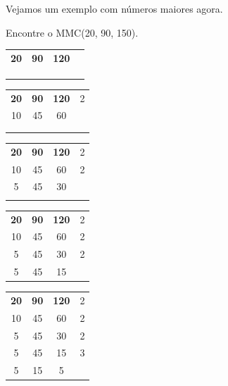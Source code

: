 Vejamos um exemplo com números maiores agora.

\begin{exemplo}
    Encontre o MMC(20, 90, 150).

    \begin{table}[H]
    \centering
    \begin{tabular}{ccc|c}
        \textbf{20} & \textbf{90} & \textbf{120} & \\
         &  &  & \\
         &  &  & \\
         &  &  & \\
    \end{tabular}
    \end{table}

    \begin{table}[H]
    \centering
    \begin{tabular}{ccc|c}
        \textbf{20} & \textbf{90} & \textbf{120} & 2\\
        10 & 45 & 60 & \\
         &  &  & \\
         &  &  & \\
    \end{tabular}
    \end{table}

    \begin{table}[H]
    \centering
    \begin{tabular}{ccc|c}
        \textbf{20} & \textbf{90} & \textbf{120} & 2\\
        10 & 45 & 60 & 2\\
        5 & 45 & 30 & \\
         &  &  & \\
    \end{tabular}
    \end{table}

    \begin{table}[H]
    \centering
    \begin{tabular}{ccc|c}
        \textbf{20} & \textbf{90} & \textbf{120} & 2\\
        10 & 45 & 60 & 2\\
        5 & 45 & 30 & 2\\
        5 & 45 & 15 & \\
    \end{tabular}
    \end{table}

    \begin{table}[H]
    \centering
    \begin{tabular}{ccc|c}
        \textbf{20} & \textbf{90} & \textbf{120} & 2\\
        10 & 45 & 60 & 2\\
        5 & 45 & 30 & 2\\
        5 & 45 & 15 & 3\\
        5 & 15 & 5 & \\
    \end{tabular}
    \end{table}


\end{exemplo}
